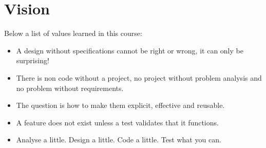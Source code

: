 \section{Vision}

Below a list of values learned in this course:
\begin{itemize}
	\item A design without specifications cannot be right or wrong, it can only be surprising!
	\item There is non code without a project, no project without problem analysis and no problem without requirements.
	\item The question is how to make them explicit, effective and reusable.
	\item A feature does not exist unless a test validates that it functions.
	\item Analyse a little. Design a little. Code a little. Test what you can.
\end{itemize}
 